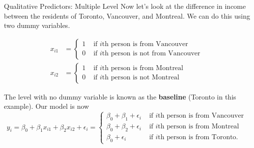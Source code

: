 \documentclass[
  ignorenonframetext,
  aspectratio=169,
]{beamer}
\begin{document}
\begin{frame}{Qualitative Predictors: Multiple Level}
\protect\hypertarget{qualitative-predictors-multiple-level}{}
Now let's look at the difference in income between the residents of
Toronto, Vancouver, and Montreal. We can do this using two dummy
variables.

\[
\begin{aligned}
x_{i 1}&=\left\{\begin{array}{ll}
1 & \text { if } i \text {th person is from Vancouver } \\
0 & \text { if } i \text {th person is not from Vancouver }
\end{array}\right.
\\
x_{i 2}&=\left\{\begin{array}{ll}
1 & \text { if } i \text {th person is from Montreal } \\
0 & \text { if } i \text {th person is not Montreal }
\end{array}\right.
\end{aligned}
\]

The level with no dummy variable is known as the \textbf{baseline}
(Toronto in this example). Our model is now \[
y_{i}=\beta_{0}+\beta_{1} x_{i 1}+\beta_{2} x_{i 2}+\epsilon_{i}=\left\{\begin{array}{ll}
\beta_{0}+\beta_{1}+\epsilon_{i} & \text { if } i \text{th person is from Vancouver } \\
\beta_{0}+\beta_{2}+\epsilon_{i} & \text { if } i \text{th person is from Montreal } \\
\beta_{0}+\epsilon_{i} & \text { if } i \text{th person is from Toronto. }
\end{array}\right.
\]
\end{frame}
\end{document}
